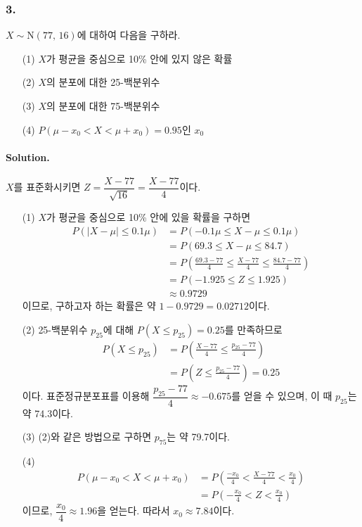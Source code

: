\subsubsection{3.} $X\sim\mathrm{N}\left(77,\,16\right)$에 대하여 다음을 구하라.

\begin{itemize}
	\item [(1)] $X$가 평균을 중심으로 10\% 안에 있지 않은 확률
	\item [(2)] $X$의 분포에 대한 25-백분위수
	\item [(3)] $X$의 분포에 대한 75-백분위수
	\item [(4)] $P\left(\mu-x_0 < X < \mu+x_0\right)=0.95$인 $x_0$
\end{itemize}

\paragraph{Solution.} $X$를 표준화시키면 $Z = \dfrac{X - 77}{\sqrt{16}} = \dfrac{X - 77}{4}$이다.

\begin{itemize}
	\item [(1)] {
		$X$가 평균을 중심으로 10\% 안에 있을 확률을 구하면 
		\begin{align*}
			P\left(\left|X-\mu\right|\leq 0.1\mu\right) &= P\left(-0.1\mu \leq X-\mu \leq 0.1\mu\right) \\
			&= P\left(69.3\leq X-\mu \leq 84.7\right) \\
			&= P\left(\frac{69.3-77}{4}\leq \frac{X-77}{4} \leq \frac{84.7-77}{4}\right) \\
			&= P\left(-1.925 \leq Z \leq 1.925\right) \\
			&\approx 0.9729
		\end{align*}
		이므로, 구하고자 하는 확률은 약 $1-0.9729=0.02712$이다.
	}
	\item [(2)] {
		25-백분위수 $p_{25}$에 대해 $P\left(X\leq p_{25}\right) = 0.25$를 만족하므로
		\begin{align*}
			P\left(X\leq p_{25}\right) &= P\left(\frac{X-77}{4}\leq \frac{p_{25}-77}{4}\right) \\
			&= P\left(Z \leq \frac{p_{25}-77}{4}\right) = 0.25
		\end{align*}
		이다. 표준정규분포표를 이용해 $\dfrac{p_{25}-77}{4} \approx -0.675$를 얻을 수 있으며, 이 때 $p_{25}$는 약 74.3이다.
	}
	\item [(3)] {
		(2)와 같은 방법으로 구하면 $p_{75}$는 약 79.7이다.
	}
	\item [(4)] {
		\begin{align*}
			P\left(\mu-x_0 < X < \mu+x_0\right) &= P\left(\frac{-x_0}{4} < \frac{X-77}{4} < \frac{x_0}{4}\right) \\
			&= P\left(-\frac{x_0}{4} < Z < \frac{x_0}{4}\right)
		\end{align*}
		이므로, $\dfrac{x_0}{4} \approx 1.96$을 얻는다. 따라서 $x_0 \approx 7.84$이다.
	}
\end{itemize}

